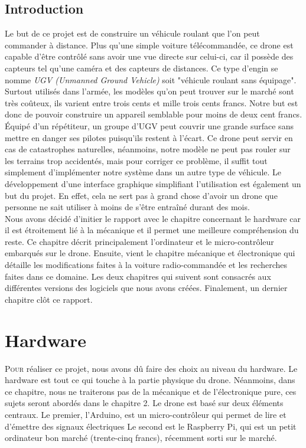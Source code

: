 \documentclass[a4paper,11pt]{report}
\begin{document}
{\section*{Introduction}
Le but de ce projet est de construire un véhicule roulant que l'on peut commander à distance. Plus qu'une simple voiture télécommandée, ce drone est capable d'être contrôlé sans avoir une vue directe sur celui-ci, car il possède des capteurs tel qu'une caméra et des capteurs de distances. Ce type d'engin se nomme \textit{UGV (Unmanned Ground Vehicle)} soit "véhicule roulant sans équipage". Surtout utilisés dans l'armée, les modèles qu'on peut trouver sur le marché sont très coûteux, ils varient entre trois cents et mille trois cents francs. Notre but est donc de pouvoir construire un appareil semblable pour moins de deux cent francs. Équipé d'un répétiteur, un groupe d'UGV peut couvrir une grande surface sans mettre en danger ses pilotes puisqu'ils restent à l'écart. Ce drone peut servir en cas de catastrophes naturelles, néanmoins, notre modèle ne peut pas rouler sur les terrains trop accidentés, mais pour corriger ce problème, il suffit tout simplement d'implémenter notre système dans un autre type de véhicule. Le développement d'une interface graphique simplifiant l'utilisation est é\-ga\-le\-ment un but du projet. En effet, cela ne sert pas à grand chose d'avoir un drone que personne ne sait utiliser à moins de s'être entraîné durant des mois.\\
Nous avons décidé d'initier le rapport avec le chapitre concernant le hardware car il est étroitement lié à la mécanique et il permet une meilleure compréhension du reste. Ce chapitre décrit principalement l'ordinateur et le micro-contrôleur \cite{microcontroleur} embarqués sur le drone. Ensuite, vient le chapitre mé\-ca\-ni\-que et électronique qui détaille les modifications faites à la voiture ra\-dio-\-com\-man\-dée et les recherches faites dans ce domaine. Les deux chapitres qui suivent sont consacrés aux différentes versions des logiciels que nous avons créées. Finalement, un dernier chapitre clôt ce rapport.
\clearpage


\chapter{Hardware}


\lettrine{P}{our} réaliser ce projet, nous avons dû faire des choix au niveau
du hardware. Le hardware est tout ce qui touche à la partie physique du drone.
Néanmoins, dans ce chapitre, nous ne traiterons pas de la mécanique et de
l'électronique pure, ces sujets
seront abordés dans le chapitre 2. Le drone est basé sur deux éléments centraux. Le
premier, l'Arduino, est un micro-contrôleur qui permet de lire et d'émettre
des signaux électriques
Le second est le Raspberry Pi, qui est un petit ordinateur bon marché
(trente-cinq francs), récemment sorti sur le marché. 

}
\end{document}
